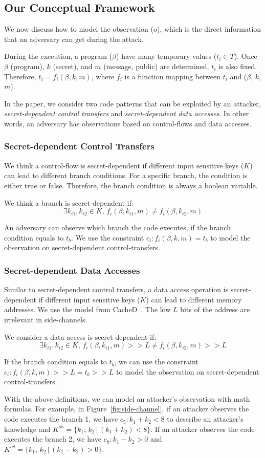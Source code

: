 \subsection{Our Conceptual Framework}
\label{side-channel:condition}
We now discuss how to model the observation (o), which is the direct information
that an adversary can get during the attack.

During the execution, a program ($\beta$) have many temporary values ($t_i \in
T$). Once $\beta$ (program), $k$ (secret), and $m$ (message, public) are
determined, $t_i$ is also fixed. Therefore, $ t_i = f_i(\beta, k, m)$, where $f_
i$ is a function mapping between $t_i$ and ($\beta$, $k$, $m$).

In the paper, we consider two code patterns that can be exploited by an attacker,
\emph{secret-dependent control transfers} and \emph{secret-dependent data
accesses}. In other words, an adversary has observations based on control-flows
and data accesses.

\subsubsection{Secret-dependent Control Transfers}
We think a control-flow is secret-dependent if different input sensitive keys
($K$) can lead to different branch conditions. For a specific branch, the
condition is either true or false. Therefore, the branch condition is always a
boolean variable.

We think a branch is secret-dependent if:
$$\exists k_{i1}, k_{i2} \in K, \,f_i(\beta, k_{i1}, m) \neq f_i(\beta, k_{i2}, m)$$

An adversary can observe which branch the code executes, if the branch condition
equals to $t_b$. We use the constraint $c_i : f_i(\beta, k, m) = t_b$ to model
the observation on secret-dependent control-transfers.

\subsubsection{Secret-dependent Data Accesses}
Similar to secret-dependent control transfers, a data access operation is
secret-dependent if different input sensitive keys ($K$) can lead to different
memory addresses. We use the model from CacheD~\cite{203878}. The low $L$ bits
of the address are irrelevant in side-channels.

We consider a data access is secret-dependent if:
$$\exists k_{i1}, k_{i2} \in K, \,f_i(\beta, k_{i1}, m) >> L \neq f_i(\beta, k_{i2}, m) >> L$$

If the branch condition equals to $t_b$, we can use the constraint $c_i :
f_i(\beta, k, m) >> L = t_b >> L$ to model the observation on secret-dependent
control-transfers.

With the above definitions, we can model an attacker's observation with math
formulas. For example, in Figure~\ref{fig:side-channel}, if an attacker observes
the code executes the branch 1, we have $c_5: k_1 + k_2 < 8$ to describe an
attacker's knowledge and $K^{o5} = \{k_1,\, k_2\,|\, (k_1 + k_2) < 8\}$. If an
attacker observes the code executes the branch 2, we have $c_8: k_1 - k_2 > 0$
and $K^{o8} = \{k_1,\, k_2\,|\, (k_1 - k_2) > 0\}$.
